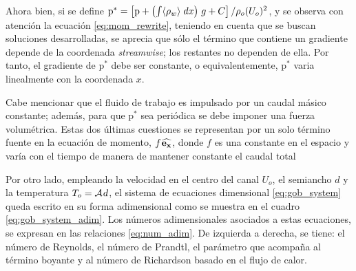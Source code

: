 
Ahora bien, si se define $\text{p}^* = \left[ \text{p} + \left( \int \langle \rho_{w} \rangle \hspace{1mm} dx \right) \hspace{0.5mm} g + C \right] / \rho_o (U_o)^2 $, y se observa con atención la ecuación \ref{eq:mom_rewrite}, teniendo en cuenta que se buscan soluciones desarrolladas, se aprecia que sólo el término que contiene un gradiente depende de la coordenada \textit{streamwise}; los restantes no dependen de ella. Por tanto, el gradiente de $\text{p}^*$ debe ser constante, o equivalentemente, $\text{p}^*$ varia linealmente con la coordenada $x$. 

Cabe mencionar que el fluido de trabajo es impulsado por un caudal másico constante; además, para que $\text{p}^*$ sea periódica se debe imponer una fuerza volumétrica. Estas dos últimas cuestiones se representan por un solo término fuente en la ecuación de momento, $f \hspace{0.3mm} \mathbf{\widehat{e_x}}$, donde $f$ es una constante en el espacio y varía con el tiempo de manera de mantener constante el caudal total %

Por otro lado, empleando la velocidad en el centro del canal $U_o$, el semiancho $d$ y la temperatura $T_o = \mathcal{A} \hspace{0.3mm} d $, el sistema de ecuaciones dimensional \ref{eq:gob_system} queda escrito en su forma adimensional como se muestra en el cuadro \ref{eq:gob_system_adim}. Los números adimensionales asociados a estas ecuaciones, se expresan en las relaciones \ref{eq:num_adim}. De izquierda a derecha, se tiene: el número de Reynolds, el número de Prandtl, el parámetro que acompaña al término boyante y al número de Richardson basado en el flujo de calor. 


